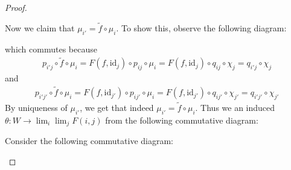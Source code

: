 \documentclass{article}
\newcommand{\id}{\mathrm{id}}
\begin{document}
\begin{proof}
\begin{center}
\begin{tikzcd}
        \end{tikzcd}
    \end{center}
    Now we claim that $\mu_{i'}=\tilde f\circ \mu_i$. To show this, observe the following diagram:
\begin{center}
    \end{center}
which commutes because
        \begin{align*}
            p_{i'j}\circ \tilde f\circ \mu_i=F(f,\id_j)\circ p_{ij}\circ \mu_i=F(f,\id_j)\circ q_{ij}\circ \chi_j=q_{i'j}\circ \chi_j
        \end{align*}
        and
        \begin{align*}
            p_{i'j'}\circ \tilde f\circ \mu_i=F(f,\id_{j'})\circ p_{ij'}\circ \mu_i=F(f,\id_{j'})\circ q_{ij'}\circ \chi_{j'}=q_{i'j'}\circ \chi_{j'}
        \end{align*}
        By uniqueness of $\mu_{i'}$, we get that indeed $\mu_{i'}=\tilde f\circ \mu_i$. Thus we an induced $\theta:W\to \lim_i\lim_j F(i,j)$ from the following commutative diagram:
        \begin{center}
        \end{center}
        Consider the following commutative diagram:
        \begin{center}
\end{center}
\end{proof}
\end{document}
